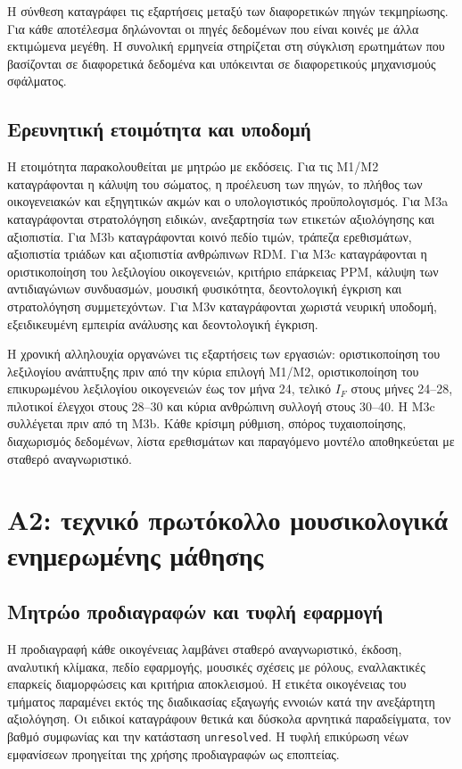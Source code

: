 \documentclass[11pt,a4paper]{article}
\begin{document}
Η σύνθεση καταγράφει τις εξαρτήσεις μεταξύ των διαφορετικών πηγών τεκμηρίωσης. Για κάθε αποτέλεσμα δηλώνονται οι πηγές δεδομένων που είναι κοινές με άλλα εκτιμώμενα μεγέθη. Η συνολική ερμηνεία στηρίζεται στη σύγκλιση ερωτημάτων που βασίζονται σε διαφορετικά δεδομένα και υπόκεινται σε διαφορετικούς μηχανισμούς σφάλματος.

\subsection{Ερευνητική ετοιμότητα και υποδομή}\label{app:impl-readiness}

Η ετοιμότητα παρακολουθείται με μητρώο με εκδόσεις. Για τις M1/M2 καταγράφονται η κάλυψη του σώματος, η προέλευση των πηγών, το πλήθος των οικογενειακών και εξηγητικών ακμών και ο υπολογιστικός προϋπολογισμός. Για M3a καταγράφονται στρατολόγηση ειδικών, ανεξαρτησία των ετικετών αξιολόγησης και αξιοπιστία. Για M3b καταγράφονται κοινό πεδίο τιμών, τράπεζα ερεθισμάτων, αξιοπιστία τριάδων και αξιοπιστία ανθρώπινων RDM. Για M3c καταγράφονται η οριστικοποίηση του λεξιλογίου οικογενειών, κριτήριο επάρκειας PPM, κάλυψη των αντιδιαγώνιων συνδυασμών, μουσική φυσικότητα, δεοντολογική έγκριση και στρατολόγηση συμμετεχόντων. Για M3ν καταγράφονται χωριστά νευρική υποδομή, εξειδικευμένη εμπειρία ανάλυσης και δεοντολογική έγκριση.

Η χρονική αλληλουχία οργανώνει τις εξαρτήσεις των εργασιών: οριστικοποίηση του λεξιλογίου ανάπτυξης πριν από την κύρια επιλογή M1/M2, οριστικοποίηση του επικυρωμένου λεξιλογίου οικογενειών έως τον μήνα 24, τελικό $I_F$ στους μήνες 24--28, πιλοτικοί έλεγχοι στους 28--30 και κύρια ανθρώπινη συλλογή στους 30--40. Η M3c συλλέγεται πριν από τη M3b. Κάθε κρίσιμη ρύθμιση, σπόρος τυχαιοποίησης, διαχωρισμός δεδομένων, λίστα ερεθισμάτων και παραγόμενο μοντέλο αποθηκεύεται με σταθερό αναγνωριστικό.


\begingroup
{}

\section{Α2: τεχνικό πρωτόκολλο μουσικολογικά ενημερωμένης μάθησης}\label{app:a2}

\subsection{Μητρώο προδιαγραφών και τυφλή εφαρμογή}
Η προδιαγραφή κάθε οικογένειας λαμβάνει σταθερό αναγνωριστικό, έκδοση, αναλυτική κλίμακα, πεδίο εφαρμογής, μουσικές σχέσεις με ρόλους, εναλλακτικές επαρκείς διαμορφώσεις και κριτήρια αποκλεισμού. Η ετικέτα οικογένειας του τμήματος παραμένει εκτός της διαδικασίας εξαγωγής εννοιών κατά την ανεξάρτητη αξιολόγηση. Οι ειδικοί καταγράφουν θετικά και δύσκολα αρνητικά παραδείγματα, τον βαθμό συμφωνίας και την κατάσταση \texttt{unresolved}. Η τυφλή επικύρωση νέων εμφανίσεων προηγείται της χρήσης προδιαγραφών ως εποπτείας.
\end{document}
